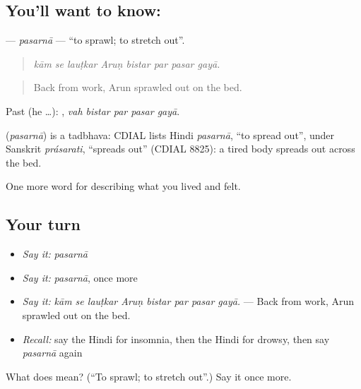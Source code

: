 \subsection*{You'll want to know: }
\textbf{} — \emph{pasarnā} — \textquotedblleft{}to sprawl; to stretch out\textquotedblright{}.

\begin{quote}
       
\end{quote}

\begin{quote}
\emph{kām se lauṭkar Aruṇ bistar par pasar gayā.}
\end{quote}

\begin{quote}
Back from work, Arun sprawled out on the bed.
\end{quote}

Past (he …):     , \emph{vah bistar par pasar gayā}.

\begin{cousinweb}
\textbf{} (\emph{pasarnā}) is a tadbhava: CDIAL lists Hindi \emph{pasarnā}, \textquotedblleft{}to spread out\textquotedblright{}, under Sanskrit \emph{prásarati}, \textquotedblleft{}spreads out\textquotedblright{} (CDIAL 8825): a tired body spreads out across the bed.
\end{cousinweb}

\begin{grammarlens}[title={What you've built}]
One more word for describing what you lived and felt.
\end{grammarlens}

\subsection*{Your turn}
\begin{itemize}
\raggedright
  \item \emph{Say it:} \emph{pasarnā}
  \item \emph{Say it:} \emph{pasarnā}, once more
  \item \emph{Say it:} \emph{kām se lauṭkar Aruṇ bistar par pasar gayā.} — Back from work, Arun sprawled out on the bed.
  \item \emph{Recall:} say the Hindi for insomnia, then the Hindi for drowsy, then say \emph{pasarnā} again
\end{itemize}

\begin{tcolorbox}[breakable,colback=teal!4,colframe=teal!35!black,title={Before you move on}]
What does  mean? (\textquotedblleft{}To sprawl; to stretch out\textquotedblright{}.) Say it once more.
\end{tcolorbox}
